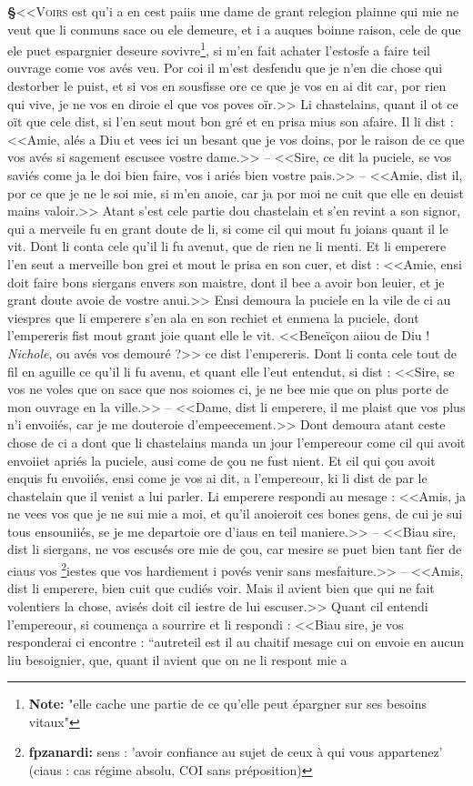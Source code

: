 \documentclass[12pt]{article} %
\newcommand{\colmar}[1]{\marginnote{[#1]}}          %
\newcommand{\persName}[1]{\emph{#1}} %
\newcommand{\supplied}[1]{\textlangle#1\textrangle} %
\newcommand{\fnnote}[1]{\footnote{\textbf{Note:} #1}} %
\newcommand{\fnfpz}[1]{\footnote{\textbf{fpzanardi:} #1}} %
\newcounter{paranum}
\newcommand{\pnum}{\stepcounter{paranum}\textbf{§\arabic{paranum}}\quad}
\begin{document}
\pnum <<\lettrine[lines=2]{\color{darkred}V}{oirs} est qu'i a en cest paiis une dame de grant relegion plainne qui mie ne veut que li conmu\supplied{n}s sace ou ele demeure, et i a auques boinne raison, cele de que ele puet espargnier deseure sovivre\fnnote{"elle cache une partie de ce qu'elle peut épargner sur ses besoins vitaux"}, si m'en fait achater l'estosfe a faire teil ouvrage come vos avés veu. Por coi il m'est desfendu que je n'en die chose qui destorber le puist, et si vos en sousfisse ore ce que je vos en ai dit car, por rien qui vive, je ne vos en diroie el que vos poves oïr.>> Li chastelains, quant il ot ce oït que cele dist, si l'en seut mout bon gré et en prisa mius son afaire. Il li dist : <<Amie, alés a Diu et vees ici un besant que je vos doins, por le raison de ce que vos avés si sagement escusee vostre dame.>> -- <<Sire, ce dit la puciele, se vos saviés come ja le doi bien faire, vos i ariés bien vostre pais.>> -- <<Amie, dist il, por ce que je ne le soi mie, si m'en anoie, car ja por moi ne cuit que elle en deuist mains valoir.>> Atant s'est cele partie dou chastelain et s'en revint a son signor, qui a merveile fu en grant doute de li, si come cil qui mout fu joians quant il le vit. Dont li conta cele qu'il li fu avenut, que de rien ne li menti. Et li emperere l'en seut a merveille bon grei et mout le prisa en son cuer, et dist : <<Amie, ensi doit faire bons siergans envers son maistre, dont il bee a avoir bon leuier, et je grant doute avoie de vostre anui.>> Ensi demoura la puciele en la vile de ci au viespres que li emperere s'en ala en son rechiet et enmena la puciele, dont l'empereris fist mout grant joie q\supplied{ua}nt elle le vit. <<Beneïçon aiiou de Diu ! \persName{Nichole}, ou avés vos demouré ?>> ce dist l'empereris. Dont li conta cele tout de fil en aguille ce qu'il li fu avenu, et quant elle l'eut entendut, si dist : <<Sire, se vos ne voles que on sace que nos soiomes ci, je ne bee mie que on plus porte de mon ouvrage en la ville.>> -- <<Dame, dist li emperere, il me plaist que vos plus n'i envoiiés, car je me douteroie d'empeecement.>> Dont demoura atant \colmar{10rb}\colmar{b} ceste chose de ci a dont que li chastelains manda un jour l'empereour come cil qui avoit envoiiet apriés la puciele, ausi come de çou ne fust nient. Et cil qui çou avoit enquis fu envoiiés, ensi come je vos ai dit, a l'empereour, ki li dist de par le chastelain que il venist a lui parler. Li emperere respondi au mesage : <<Amis, ja ne vees vos que je ne sui mie a moi, et qu'il anoieroit ces bones gens, de cui je sui tous ensouniiés, se je me departoie ore d'iaus en teil maniere.>> -- <<Biau sire, dist li siergans, ne vos escusés ore mie de çou, car mesire se puet bien tant fïer de ciaus vos \fnfpz{sens : 'avoir confiance au sujet de ceux à qui vous appartenez' (ciaus : cas régime absolu, COI sans préposition)}iestes que vos hardiement i povés venir sans mesfaiture.>> -- <<Amis, dist li emperere, b\supplied{ie}n cuit que cudiés voir. Mais il avient bien que qui ne fait volentiers la chose, avisés doit cil iestre de lui escuser.>> Quant cil entendi l'empereour, si coumença a sourrire et li respondi : <<Biau sire, je vos responderai ci encontre : ``autreteil est il au chaitif mesage cui on envoie en aucun liu besoignier, que, quant il avient que on ne li respont mie a 
\end{document}
